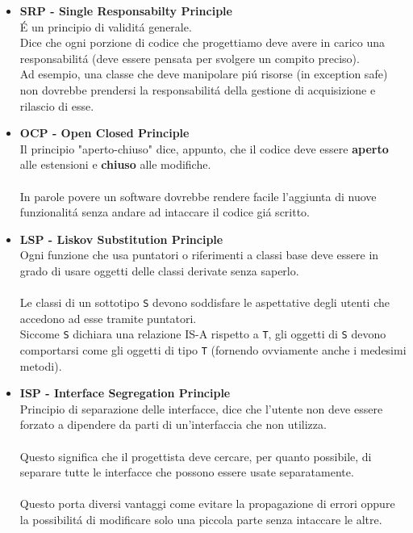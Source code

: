 \documentclass{article}
\begin{document}
\begin{itemize}
\item \textbf{\textcolor{blu}{SRP - Single Responsabilty Principle}}\\ \'E un principio di validit\'a generale.\\Dice che ogni porzione di codice che progettiamo deve avere in carico una responsabilit\'a (deve essere pensata per svolgere un compito preciso).\\Ad esempio, una classe che deve manipolare pi\'u risorse (in exception safe) non dovrebbe prendersi la responsabilit\'a della gestione di acquisizione e rilascio di esse.\\
\item \textbf{\textcolor{blu}{OCP - Open Closed Principle}}\\Il principio "aperto-chiuso" dice, appunto, che il codice deve essere \textbf{aperto} alle estensioni e \textbf{chiuso} alle modifiche.\\ \\In parole povere un software dovrebbe rendere facile l'aggiunta di nuove funzionalit\'a senza andare ad intaccare il codice gi\'a scritto. \\
\item \textbf{\textcolor{blu}{LSP - Liskov Substitution Principle}}\\Ogni funzione che usa puntatori o riferimenti a classi base deve essere in grado di usare oggetti delle classi derivate senza saperlo.\\ \\Le classi di un sottotipo \texttt{S} devono soddisfare le aspettative degli utenti che accedono ad esse tramite puntatori.\\Siccome \texttt{S} dichiara una relazione IS-A rispetto a \texttt{T}, gli oggetti di \texttt{S} devono comportarsi come gli oggetti di tipo \texttt{T} (fornendo ovviamente anche i medesimi metodi).\\
\item \textbf{\textcolor{blu}{ISP - Interface Segregation Principle}}\\Principio di separazione delle interfacce, dice che l'utente non deve essere forzato a dipendere da parti di un'interfaccia che non utilizza.\\ \\Questo significa che il progettista deve cercare, per quanto possibile, di separare tutte le interfacce che possono essere usate separatamente.\\ \\Questo porta diversi vantaggi come evitare la propagazione di errori oppure la possibilit\'a di modificare solo una piccola parte senza intaccare le altre.\\

\end{itemize}
\end{document}
